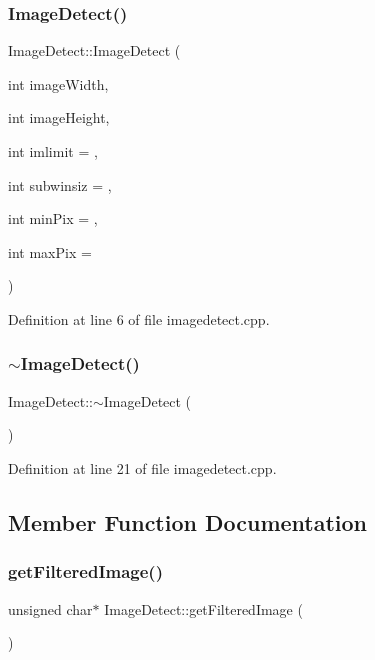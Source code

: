 \subsubsection{\texorpdfstring{ImageDetect()}{ImageDetect()}}
{\footnotesize\ttfamily Image\+Detect\+::\+Image\+Detect (\begin{DoxyParamCaption}\item[{int}]{image\+Width,  }\item[{int}]{image\+Height,  }\item[{int}]{imlimit = {},  }\item[{int}]{subwinsiz = {},  }\item[{int}]{min\+Pix = {},  }\item[{int}]{max\+Pix = {} }\end{DoxyParamCaption})}



Definition at line 6 of file imagedetect.\+cpp.

\mbox{\label{class_image_detect_ae62102131d454c944194d77a9feba76c}} 
\subsubsection{\texorpdfstring{$\sim$ImageDetect()}{~ImageDetect()}}
{\footnotesize\ttfamily Image\+Detect\+::$\sim$\+Image\+Detect (\begin{DoxyParamCaption}{ }\end{DoxyParamCaption})}



Definition at line 21 of file imagedetect.\+cpp.



\subsection{Member Function Documentation}
\mbox{\label{class_image_detect_ad825631c35588b68c69911097b2d26de}} 
\subsubsection{\texorpdfstring{getFilteredImage()}{getFilteredImage()}}
{\footnotesize\ttfamily unsigned char$\ast$ Image\+Detect\+::get\+Filtered\+Image (\begin{DoxyParamCaption}{ }\end{DoxyParamCaption})\hspace{0.3cm}{\ttfamily [inline]}}



